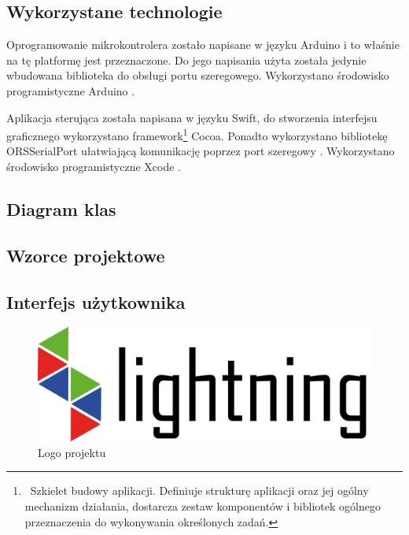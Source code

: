 \documentclass[12pt]{report}
\begin{document}
\subsection{Wykorzystane technologie}

Oprogramowanie mikrokontrolera zostało napisane w języku Arduino i to właśnie na tę platformę jest przeznaczone. Do jego napisania użyta została jedynie wbudowana biblioteka do obsługi portu szeregowego. Wykorzystano środowisko programistyczne Arduino \cite{arduinoide}.

Aplikacja sterująca została napisana w języku Swift, do stworzenia interfejsu graficznego wykorzystano framework\footnote{~Szkielet budowy aplikacji. Definiuje strukturę aplikacji oraz jej ogólny mechanizm działania, dostarcza zestaw komponentów i bibliotek ogólnego przeznaczenia do wykonywania określonych zadań.} Cocoa. Ponadto wykorzystano bibliotekę\\ORSSerialPort ułatwiającą komunikację poprzez port szeregowy \cite{orsserialport}. Wykorzystano środowisko programistyczne Xcode \cite{xcode}.

\subsection{Diagram klas}


\subsection{Wzorce projektowe}


\subsection{Interfejs użytkownika}

\begin{figure}[h]
\centering
\includegraphics[width=\textwidth]{../resources/logo.png}
\caption{Logo projektu}
\end{figure}
\end{document}
